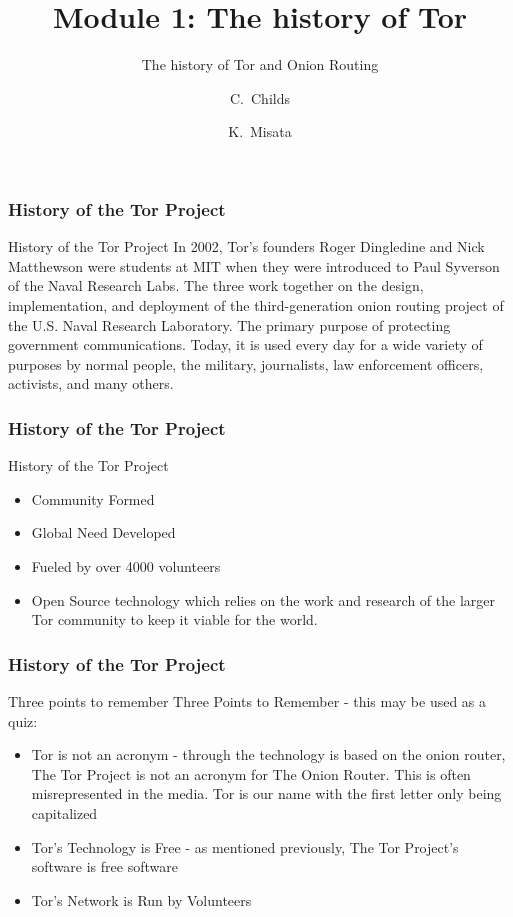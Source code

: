 \documentclass{beamer}
\title[Module 1: The history of Tor]
{Module 1: The history of Tor}
\subtitle{The history of Tor and Onion Routing}
\author[]
{C.~Childs\inst{1} \and K.~Misata\inst{2}}
\institute[The Tor Project]
{
  \inst{1}
  Support assistant / Translation coordinator\\
  The Tor Project
  \and
  \inst{2}
  Outreach coordinator\\
  The Tor Project
}
\begin{document}
\frame{\titlepage}

\begin{frame}
\frametitle{History of the Tor Project}
	\begin{block}{History of the Tor Project}
          In 2002, Tor's founders Roger Dingledine and Nick Matthewson were students at MIT when they were introduced to Paul Syverson of the Naval Research Labs. The three work together on the design, implementation, and deployment of the third-generation onion routing project of the U.S. Naval Research Laboratory. The primary purpose of protecting government communications. Today, it is used every day for a wide variety of purposes by normal people, the military, journalists, law enforcement officers, activists, and many others.
	\end{block}
\end{frame}

\begin{frame}
\frametitle{History of the Tor Project}
	\begin{block}{History of the Tor Project}
		\begin{itemize}
			\item<1-> Community Formed
			\item<2-> Global Need Developed
			\item<3-> Fueled by over 4000 volunteers
			\item<4-> Open Source technology which relies on the work and research of the larger Tor community to keep it viable for the world.
		\end{itemize}
	\end{block}
\end{frame}

\begin{frame}
\frametitle{History of the Tor Project}
	\begin{block}{Three points to remember}
          Three Points to Remember - this may be used as a quiz: \pause
		\begin{itemize}
			\item<1-> Tor is not an acronym - through the technology is based on the onion router, The Tor Project is not an acronym for The Onion Router. This is often misrepresented in the media. Tor is our name with the first letter only being capitalized \pause
			\item<2-> Tor's Technology is Free - as mentioned previously, The Tor Project's software is free software \pause
			\item<3-> Tor's Network is Run by Volunteers
		\end{itemize}
	\end{block}
\end{frame}
\end{document}
